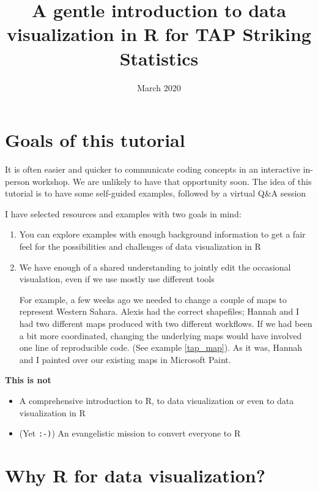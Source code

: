 \documentclass{article}
\title{A gentle introduction to data visualization in R for TAP Striking
  Statistics}
\date{March 2020}
\begin{document}
\maketitle

\section{Goals of this tutorial}

It is often easier and quicker to communicate coding concepts
    in an interactive in-person workshop. We are unlikely to have that
    opportunity soon. The idea of this tutorial is to have some
    self-guided examples, followed by a virtual Q\&A session
 
I have selected resources and examples with two goals in mind:
\begin{enumerate}
\item You can explore examples with enough background information to
  get a fair feel for the possibilities and challenges of data
  visualization in R
  \item We have enough of a shared understanding to jointly edit the
    occasional visualation, even if we use mostly use different
    tools

    \begin{framed}
    For example, a few weeks ago we needed to change a couple
    of maps to represent Western Sahara. Alexis had the correct
    shapefiles; Hannah and I had two different maps produced with two
    different workflows. If we had been a bit more coordinated,
    changing the underlying maps would have involved one line of reproducible
    code. (See example \ref{tap_map}). As it was, Hannah and I painted
    over our existing maps in Microsoft Paint.
  \end{framed}
\end{enumerate}
    
  \textbf{This is not}
\begin{itemize}
\item  A comprehensive introduction to R, to
      data visualization or even to data visualization in R
\item (Yet {\tt:-)}) An evangelistic mission to convert everyone to R
  
\end{itemize}


\section{Why R for data visualization?}
\end{document}
